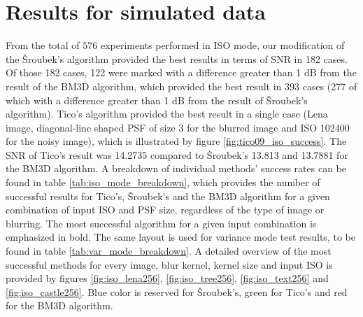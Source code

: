 \documentclass[12pt,notitlepage]{report}
\begin{document}
\clearpage

\section{Results for simulated data}
\label{sec:simulated_data}

From the total of $576$ experiments performed in ISO mode, our modification of the Šroubek's algorithm provided the best results in terms of SNR in 182 cases. Of those 182 cases, 122 were marked with a difference greater than 1 dB from the result of the BM3D algorithm, which provided the best result in 393 cases (277 of which with a difference greater than 1 dB from the result of Šroubek's algorithm). Tico's algorithm provided the best result in a single case (Lena image, diagonal-line shaped PSF of size 3 for the blurred image and ISO 102400 for the noisy image), which is illustrated by figure \ref{fig:tico09_iso_success}.  The SNR of Tico's result was 14.2735 compared to Šroubek's 13.813 and 13.7881 for the BM3D algorithm. A breakdown of individual methods' success rates can be found in table \ref{tab:iso_mode_breakdown}, which provides the number of successful results for Tico's, Šroubek's and the BM3D algorithm for a given combination of input ISO and PSF size, regardless of the type of image or blurring. The most successful algorithm for a given input combination is emphasized in bold. The same layout is used for variance mode test results, to be found in table \ref{tab:var_mode_breakdown}. A detailed overview of the most successful methods for every image, blur kernel, kernel size and input ISO is provided by figures \ref{fig:iso_lena256}, \ref{fig:iso_tree256}, \ref{fig:iso_text256} and \ref{fig:iso_castle256}. Blue color is reserved for Šroubek's, green for Tico's and red for the BM3D algorithm.       
\end{document}
